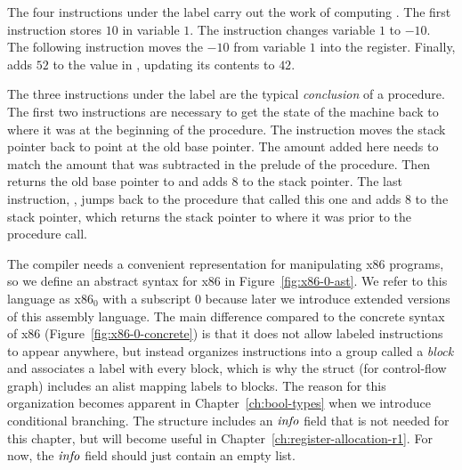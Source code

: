 \documentclass[11pt]{book}
\begin{document}
The four instructions under the label  carry out the work
of computing .
%
The first instruction  stores $10$ in
variable $1$.
%
The instruction  changes variable $1$ to $-10$.
%
The following instruction moves the $-10$ from variable $1$ into the
 register.  Finally,  adds $52$ to
the value in , updating its contents to $42$.

The three instructions under the label  are the
typical \emph{conclusion} of a procedure.  The first
two instructions are necessary to get the state of the machine back to
where it was at the beginning of the procedure.  The instruction
 moves the stack pointer back to point at the
old base pointer. The amount added here needs to match the amount that
was subtracted in the prelude of the procedure. Then 
returns the old base pointer to  and adds $8$ to the stack
pointer.  The last instruction, , jumps back to the
procedure that called this one and adds 8 to the stack pointer, which
returns the stack pointer to where it was prior to the procedure call.

The compiler needs a convenient representation for manipulating x86
programs, so we define an abstract syntax for x86 in
Figure~\ref{fig:x86-0-ast}. We refer to this language as x86$_0$ with
a subscript $0$ because later we introduce extended versions of this
assembly language. The main difference compared to the concrete syntax
of x86 (Figure~\ref{fig:x86-0-concrete}) is that it does not allow
labeled instructions to appear anywhere, but instead organizes
instructions into a group called a \emph{block}
and associates a label with every block, which is why the  struct
(for control-flow graph) includes an alist mapping labels to
blocks. The reason for this organization becomes apparent in
Chapter~\ref{ch:bool-types} when we introduce conditional
branching. The  structure includes an $\mathit{info}$ field
that is not needed for this chapter, but will become useful in
Chapter~\ref{ch:register-allocation-r1}.  For now, the $\mathit{info}$
field should just contain an empty list.
\end{document}
